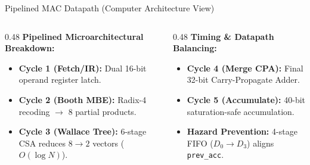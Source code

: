 \documentclass[aspectratio=169,10pt]{beamer}
\begin{document}
\begin{frame}{Pipelined MAC Datapath (Computer Architecture View)}
  \vspace{1mm}
  \begin{columns}[T]
    \begin{column}{0.48\textwidth}
      \scriptsize
      \textbf{Pipelined Microarchitectural Breakdown:}
      \begin{itemize}\scriptsize
        \item \textbf{Cycle 1 (Fetch/IR):} Dual 16-bit operand register latch.
        \item \textbf{Cycle 2 (Booth MBE):} Radix-4 recoding $\to$ 8 partial products.
        \item \textbf{Cycle 3 (Wallace Tree):} 6-stage CSA reduces $8 \to 2$ vectors ($O(\log N)$).
      \end{itemize}
    \end{column}
    \begin{column}{0.48\textwidth}
      \scriptsize
      \textbf{Timing \& Datapath Balancing:}
      \begin{itemize}\scriptsize
        \item \textbf{Cycle 4 (Merge CPA):} Final 32-bit Carry-Propagate Adder.
        \item \textbf{Cycle 5 (Accumulate):} 40-bit saturation-safe accumulation.
        \item \textbf{Hazard Prevention:} 4-stage FIFO ($D_0 \to D_3$) aligns \texttt{prev\_acc}.
      \end{itemize}
    \end{column}
  \end{columns}
\end{frame}
\end{document}
